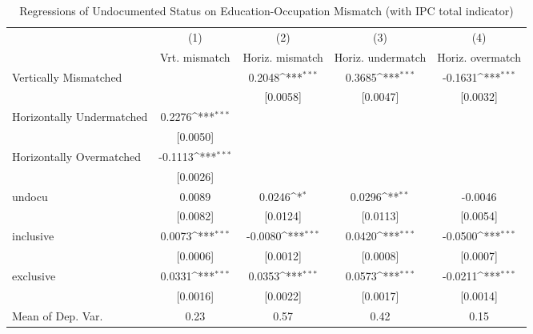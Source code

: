 \begin{table}[htbp]\centering
\def\sym#1{\ifmmode^{#1}\else\(^{#1}\)\fi}
\caption{Regressions of Undocumented Status on Education-Occupation Mismatch (with IPC total indicator)}
\begin{tabular}{l*{4}{c}}
\toprule
                    &\multicolumn{1}{c}{(1)}         &\multicolumn{1}{c}{(2)}         &\multicolumn{1}{c}{(3)}         &\multicolumn{1}{c}{(4)}         \\
                    &Vrt. mismatch         &Horiz. mismatch         &Horiz. undermatch         &Horiz. overmatch         \\
\midrule
Vertically Mismatched&                     &      0.2048\sym{***}&      0.3685\sym{***}&     -0.1631\sym{***}\\
                    &                     &    [0.0058]         &    [0.0047]         &    [0.0032]         \\
\addlinespace
Horizontally Undermatched&      0.2276\sym{***}&                     &                     &                     \\
                    &    [0.0050]         &                     &                     &                     \\
\addlinespace
Horizontally Overmatched&     -0.1113\sym{***}&                     &                     &                     \\
                    &    [0.0026]         &                     &                     &                     \\
\addlinespace
undocu              &      0.0089         &      0.0246\sym{*}  &      0.0296\sym{**} &     -0.0046         \\
                    &    [0.0082]         &    [0.0124]         &    [0.0113]         &    [0.0054]         \\
\addlinespace
inclusive           &      0.0073\sym{***}&     -0.0080\sym{***}&      0.0420\sym{***}&     -0.0500\sym{***}\\
                    &    [0.0006]         &    [0.0012]         &    [0.0008]         &    [0.0007]         \\
\addlinespace
exclusive           &      0.0331\sym{***}&      0.0353\sym{***}&      0.0573\sym{***}&     -0.0211\sym{***}\\
                    &    [0.0016]         &    [0.0022]         &    [0.0017]         &    [0.0014]         \\
\midrule
Mean of Dep. Var.   &        0.23         &        0.57         &        0.42         &        0.15         \\

\end{tabular}
\end{table}
